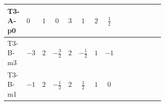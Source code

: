 \documentclass[8pt]{article}
\begin{document}
\begin{landscape}
\begin{longtable}{@{}llcccccc >{\raggedright\arraybackslash}p{0.21\linewidth} >{\raggedright\arraybackslash}p{0.21\linewidth} >{\raggedright\arraybackslash}p{0.21\linewidth}@{}}
\midrule
T3-A-p0 & $0$ & $1$ & $0$ & $3$ & $1$ & $2$ & $\frac{1}{2}$ & \scriptsize\adjustbox{max width=\linewidth}{$\begin{gathered} -\frac{3}{2} (\left({Y_d}\,\left({Y_d}\right)^{\dagger}\,{Y_u}\right)_{ij}-\left({Y_u}\,\left({Y_u}\right)^{\dagger}\,{Y_u}\right)_{ij})\end{gathered}$} & \scriptsize\adjustbox{max width=\linewidth}{$\begin{gathered} -\frac{9}{4} {g_2}^2 \left({Y_u}\right)_{ij}\end{gathered}$} & \scriptsize\adjustbox{max width=\linewidth}{$\begin{gathered} -8 {g_3}^2 \left({Y_u}\right)_{ij}\end{gathered}$} \\
\midrule
T3-B-m3 & $-3$ & $2$ & $-\frac{3}{2}$ & $2$ & $-\frac{1}{2}$ & $1$ & $-1$ & \scriptsize\adjustbox{max width=\linewidth}{$\begin{gathered} -\frac{3}{2} (\left({Y_d}\,\left({Y_d}\right)^{\dagger}\,{Y_u}\right)_{ij}-\left({Y_u}\,\left({Y_u}\right)^{\dagger}\,{Y_u}\right)_{ij})\end{gathered}$} & \scriptsize\adjustbox{max width=\linewidth}{$\begin{gathered} -\frac{9}{4} {g_2}^2 \left({Y_u}\right)_{ij}\end{gathered}$} & \scriptsize\adjustbox{max width=\linewidth}{$\begin{gathered} -8 {g_3}^2 \left({Y_u}\right)_{ij}\end{gathered}$} \\
\midrule
T3-B-m1 & $-1$ & $2$ & $-\frac{1}{2}$ & $2$ & $\frac{1}{2}$ & $1$ & $0$ & \scriptsize\adjustbox{max width=\linewidth}{$\begin{gathered} -\frac{3}{2} (\left({Y_d}\,\left({Y_d}\right)^{\dagger}\,{Y_u}\right)_{ij}-\left({Y_u}\,\left({Y_u}\right)^{\dagger}\,{Y_u}\right)_{ij})\end{gathered}$} & \scriptsize\adjustbox{max width=\linewidth}{$\begin{gathered} -\frac{9}{4} {g_2}^2 \left({Y_u}\right)_{ij}\end{gathered}$} & \scriptsize\adjustbox{max width=\linewidth}{$\begin{gathered} -8 {g_3}^2 \left({Y_u}\right)_{ij}\end{gathered}$} \\
\midrule

\end{longtable}
\end{landscape}
\end{document}
